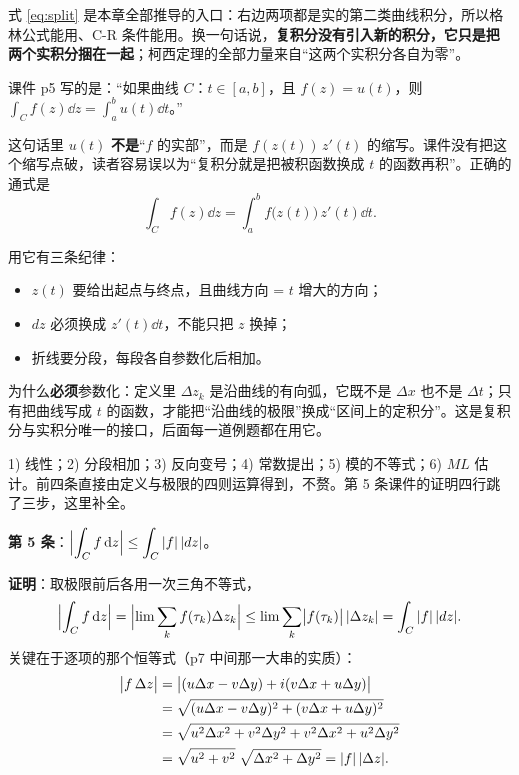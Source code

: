 \documentclass[11pt]{ctexart}
\let\origsubhdr\subhdr
\renewcommand{\subhdr}[1]{\par\needspace{4\baselineskip}\origsubhdr{#1}}
\begin{document}
式 \eqref{eq:split} 是本章全部推导的入口：右边两项都是实的第二类曲线积分，所以格林公式能用、C-R 条件能用。换一句话说，\textbf{复积分没有引入新的积分，它只是把两个实积分捆在一起}；柯西定理的全部力量来自“这两个实积分各自为零”。


课件 p5 写的是：“如果曲线 $C$：$t\in[a,b]$，且 $f(z)=u(t)$，则 $\displaystyle\int_C f(z)\dd z=\int_a^b u(t)\dd t$。”

这句话里 $u(t)$ \textbf{不是}“$f$ 的实部”，而是 $f(z(t))\,z'(t)$ 的缩写。课件没有把这个缩写点破，读者容易误以为“复积分就是把被积函数换成 $t$ 的函数再积”。正确的通式是
\begin{equation}\label{eq:param}
\int_C f(z)\dd z=\int_a^b f\bigl(z(t)\bigr)\,z'(t)\dd t .
\end{equation}

用它有三条纪律：

\begin{itemize}
\item[(i)] $z(t)$ 要给出起点与终点，且曲线方向 = $t$ 增大的方向；
\item[(ii)] $dz$ 必须换成 $z'(t)\dd t$，不能只把 $z$ 换掉；
\item[(iii)] 折线要分段，每段各自参数化后相加。
\end{itemize}

为什么\textbf{必须}参数化：定义里 $\Delta z_k$ 是沿曲线的有向弧，它既不是 $\Delta x$ 也不是 $\Delta t$；只有把曲线写成 $t$ 的函数，才能把“沿曲线的极限”换成“区间上的定积分”。这是复积分与实积分唯一的接口，后面每一道例题都在用它。


1) 线性；2) 分段相加；3) 反向变号；4) 常数提出；5) 模的不等式；6) $ML$ 估计。前四条直接由定义与极限的四则运算得到，不赘。第 5 条课件的证明四行跳了三步，这里补全。

\textbf{第 5 条}：$\displaystyle\Bigl|\int_C f\,\mathrm{d} z\Bigr|\le\int_C|f|\,|dz|$。

\textbf{证明}：取极限前后各用一次三角不等式，
\[ \Bigl|\int_C f\,\mathrm{d} z\Bigr|=\Bigl|\lim\sum_k f(\tau_k)\Delta z_k\Bigr|
\le\lim\sum_k\bigl|f(\tau_k)\bigr|\,|\Delta z_k|=\int_C|f|\,|dz| . \]
关键在于逐项的那个恒等式（p7 中间那一大串的实质）：
\begin{align}
\bigl|f\,\Delta z\bigr|
&=\bigl|(u\Delta x-v\Delta y)+i(v\Delta x+u\Delta y)\bigr|\notag\\
&=\sqrt{(u\Delta x-v\Delta y)^{2}+(v\Delta x+u\Delta y)^{2}}\notag\\
&=\sqrt{u^{2}\Delta x^{2}+v^{2}\Delta y^{2}+v^{2}\Delta x^{2}+u^{2}\Delta y^{2}}\notag\\
&=\sqrt{u^{2}+v^{2}}\;\sqrt{\Delta x^{2}+\Delta y^{2}}=|f|\,|\Delta z| .
\end{align}
\end{document}
